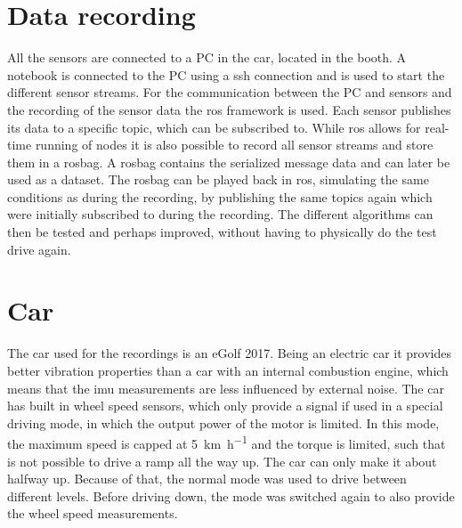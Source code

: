 \section{Data recording}
All the sensors are connected to a PC in the car, located in the booth.
A notebook is connected to the PC using a \gls{ssh} connection and is used to start the different sensor streams.
For the communication between the PC and sensors and the recording of the sensor data the \gls{ros} framework is used.
Each sensor publishes its data to a specific topic, which can be subscribed to.
While \gls{ros} allows for real-time running of nodes it is also possible to record all sensor streams and store them in a rosbag.
A rosbag contains the serialized message data and can later be used as a dataset.
The rosbag can be played back in \gls{ros}, simulating the same conditions as during the recording, by publishing the same topics again which were initially subscribed to during the recording.
The different algorithms can then be tested and perhaps improved, without having to physically do the test drive again.


\section{Car}
\label{sec:car}
The car used for the recordings is an eGolf 2017.
Being an electric car it provides better vibration properties than a car with an internal combustion engine, which means that the \gls{imu} measurements are less influenced by external noise.
The car has built in wheel speed sensors, which only provide a signal if used in a special driving mode, in which the output power of the motor is limited.
In this mode, the maximum speed is capped at \SI{5}{\kilo\metre\per\hour} and the torque is limited, such that is not possible to drive a ramp all the way up.
The car can only make it about halfway up.
Because of that, the normal mode was used to drive between different levels.
Before driving down, the mode was switched again to also provide the wheel speed measurements.



